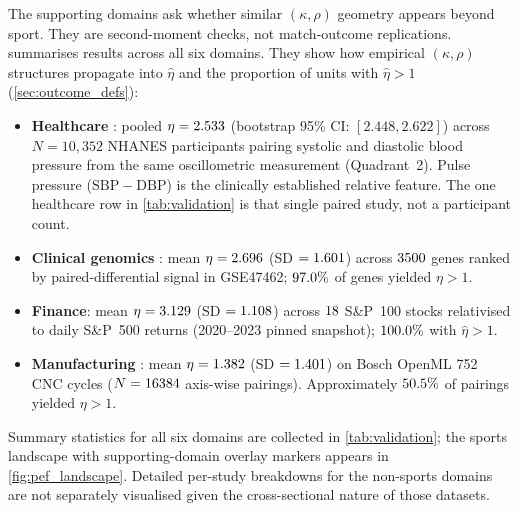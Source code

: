 The supporting domains ask whether similar $(\kappa,\rho)$ geometry appears beyond sport. They are second-moment checks, not match-outcome replications.  summarises results across all six domains. They show how empirical $(\kappa,\rho)$ structures propagate into $\hat\eta$ and the proportion of units with $\hat\eta>1$ (\cref{sec:outcome_defs}):
\begin{itemize}
  \item \textbf{Healthcare} \parencite{nhanes2017pbxo}: pooled $\eta=2.533$ (bootstrap 95\% CI: $[2.448,2.622]$) across $N=10{,}352$ {NHANES} participants pairing systolic and diastolic blood pressure from the same oscillometric measurement (Quadrant~2). Pulse pressure ($\mathrm{SBP}-\mathrm{DBP}$) is the clinically established relative feature. The one healthcare row in \cref{tab:validation} is that single paired study, not a participant count.
  \item \textbf{Clinical genomics} \parencite{brunner2014earlybreast,geoGSE47462}: mean $\eta=2.696$ ({SD} $=1.601$) across $3500$ genes ranked by paired-differential signal in {GSE47462}; $97.0\%$ of genes yielded $\eta>1$.
  \item \textbf{Finance}: mean $\eta=3.129$ ({SD} $=1.108$) across $18$ {S\&P}~100 stocks relativised to daily {S\&P}~500 returns (2020--2023 pinned snapshot); $100.0\%$ with $\hat\eta>1$.
  \item \textbf{Manufacturing} \parencite{openml752bosch}: mean $\eta=1.382$ ({SD} $=1.401$) on {Bosch} {OpenML} 752 {CNC} cycles ($N=16384$ axis-wise pairings). Approximately $50.5\%$ of pairings yielded $\eta>1$.
\end{itemize}
Summary statistics for all six domains are collected in \cref{tab:validation}; the sports landscape with supporting-domain overlay markers appears in \cref{fig:pef_landscape}. Detailed per-study breakdowns for the non-sports domains are not separately visualised given the cross-sectional nature of those datasets.

